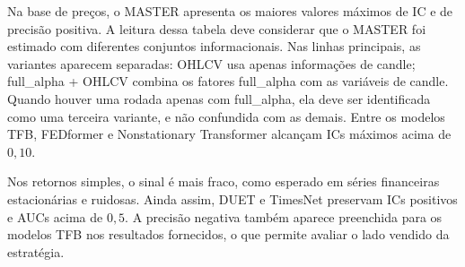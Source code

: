 \documentclass[12pt,a4paper]{article}
\begin{document}
Na base de preços, o MASTER apresenta os maiores valores máximos de IC e de precisão positiva. A leitura dessa tabela deve considerar que o MASTER foi estimado com diferentes conjuntos informacionais. Nas linhas principais, as variantes aparecem separadas: OHLCV usa apenas informações de candle; full\_alpha + OHLCV combina os fatores full\_alpha com as variáveis de candle. Quando houver uma rodada apenas com full\_alpha, ela deve ser identificada como uma terceira variante, e não confundida com as demais. Entre os modelos TFB, FEDformer e Nonstationary Transformer alcançam ICs máximos acima de $0{,}10$.

\begin{table}[H]
\centering
\scriptsize
\caption{Base de retornos simples: estatísticas medianas e máximas em $k=1$.}
\label{tab:retornos}
\end{table}

Nos retornos simples, o sinal é mais fraco, como esperado em séries financeiras estacionárias e ruidosas. Ainda assim, DUET e TimesNet preservam ICs positivos e AUCs acima de $0{,}5$. A precisão negativa também aparece preenchida para os modelos TFB nos resultados fornecidos, o que permite avaliar o lado vendido da estratégia.
\end{document}

